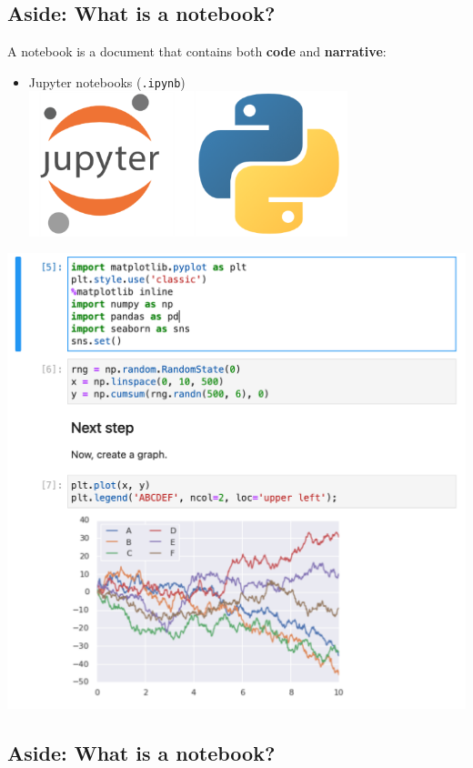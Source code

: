 \documentclass[
  letterpaper,
  DIV=11,
  numbers=noendperiod]{scrartcl}
\providecommand{\tightlist}{%
  \setlength{\itemsep}{0pt}\setlength{\parskip}{0pt}}\usepackage{longtable,booktabs,array}
\begin{document}
\subsection{Aside: What is a notebook?}\label{aside-what-is-a-notebook}

A notebook is a document that contains both \textbf{code} and
\textbf{narrative}:

\begin{itemize}
\tightlist
\item
  Jupyter notebooks (\texttt{.ipynb})
  \includegraphics[width=3.64583in,height=\textheight]{img/jupy.png}
\end{itemize}

\includegraphics{img/jupyternotebook.png}

\subsection{Aside: What is a
notebook?}\label{aside-what-is-a-notebook-1}
\end{document}
